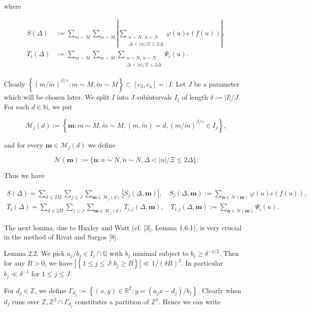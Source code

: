 \documentclass[10pt]{article}
\begin{document}
where

$$
\begin{aligned}
S(\Delta)&:=\sum_{m\sim M}\sum_{\tilde m\sim M}
\left|\sum_{\substack{n\sim N,\ \tilde n\sim N\\
\Delta<|u|/\Xi\leqslant 2\Delta}}\varphi(u)e(f(u))\right|,\\
T_i(\Delta)&:=\sum_{m\sim M}\sum_{\tilde m\sim M}
\sum_{\substack{n\sim N,\ \tilde n\sim N\\
\Delta<|u|/\Xi\leqslant 2\Delta}}\Psi_i(u).
\end{aligned}
$$

Clearly $\left\{(m / \tilde{m})^{\beta / \gamma}: m \sim M, \tilde{m} \sim M\right\} \subset\left[c_{3}, c_{4}\right]=: I$. Let $J$ be a parameter which will be chosen later. We split $I$ into $J$ subintervals $I_{j}$ of length $\delta:=|I| / J$. For each $d \in \mathbb{N}$, we put

$$
\mathscr{M}_{j}(d):=\left\{\mathbf{m}: m \sim M, \tilde{m} \sim M,(m, \tilde{m})=d,(m / \tilde{m})^{\beta / \gamma} \in I_{j}\right\},
$$

and for every $\mathbf{m} \in \mathscr{M}_{j}(d)$ we define

$$
\mathscr{N}(\mathbf{m}):=\{\mathbf{n}: n \sim N, \tilde{n} \sim N, \Delta<|u| / \Xi \leqslant 2 \Delta\} .
$$

Thus we have


\begin{gather*}
S(\Delta)=\sum_{d\leqslant 2M}\sum_{j\leqslant J}\sum_{\mathbf m\in\mathscr M_j(d)}
|S_j(\Delta,\mathbf m)|,
\quad S_j(\Delta,\mathbf m):=\sum_{\mathbf n\in\mathscr N(\mathbf m)}\varphi(u)e(f(u)),
\tag{2.3}\\
T_i(\Delta)=\sum_{d\leqslant 2M}\sum_{j\leqslant J}\sum_{\mathbf m\in\mathscr M_j(d)}
T_{i,j}(\Delta,\mathbf m),
\quad T_{i,j}(\Delta,\mathbf m):=\sum_{\mathbf n\in\mathscr N(\mathbf m)}\Psi_i(u).
\tag{2.3$'$}
\end{gather*}


The next lemma, due to Huxley and Watt (cf. [3], Lemma 1.6.1), is very crucial in the method of Rivat and Sargos [8].

Lemma 2.2. We pick $a_{j} / b_{j} \in I_{j} \cap \mathbb{Q}$ with $b_j$ minimal subject to $b_j\geqslant\delta^{-1/2}$. Then for any $B>0$, we have $\left|\left\{1 \leqslant j \leqslant J: b_{j} \geqslant B\right\}\right| \ll 1 /(\delta B)^{2}$. In particular $b_{j} \ll \delta^{-1}$ for $1 \leqslant j \leqslant J$.

For $d_{j} \in \mathbb{Z}$, we define $\Gamma_{d_{j}}:=\left\{(x, y) \in \mathbb{R}^{2}: y=\left(a_{j} x-d_{j}\right) / b_{j}\right\}$. Clearly when $d_{j}$ runs over $\mathbb{Z}, \mathbb{Z}^{2} \cap \Gamma_{d_{j}}$ constitutes a partition of $\mathbb{Z}^{2}$. Hence we can write
\end{document}
